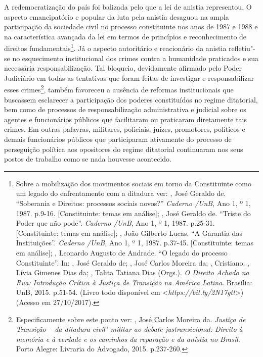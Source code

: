 A redemocratização do país foi balizada pelo que a lei de anistia
representou. O aspecto emancipatório e popular da luta pela anistia
desaguou na ampla participação da sociedade civil no processo
constituinte nos anos de 1987 e 1988 e na característica avançada da lei
em termos de princípios e reconhecimento de direitos
fundamentais\footnote{Sobre a mobilização dos movimentos sociais em
  torno da Constituinte como um legado do enfrentamento com a ditadura
  ver:  , José Geraldo de. ``Soberania e Direitos: processos
  sociais novos?'' \emph{Caderno /UnB}, Ano 1, º 1, 1987. p.9-16.
  {[}Constituinte: temas em análise{]};  , José Geraldo de.
  ``Triste do Poder que não pode''. \emph{Caderno /UnB}, Ano 1, º 1,
  1987. p.25-31. {[}Constituinte: temas em análise{]}; , João
  Gilberto Lucas. ``A Garantia das Instituições''. \emph{Caderno
  /UnB}, Ano 1, º 1, 1987. p.37-45. {[}Constituinte: temas em
  análise{]}; , Leonardo Augusto de Andrade. ``O legado do processo
  Constituinte''. In:  ,
  José Geraldo de;  , José
  Carlos Moreira da; , Cristiano; , Lívia Gimenes Dias da;
  , Talita Tatiana Dias (Orgs.). \emph{O Direito Achado na Rua:
  Introdução Crítica à Justiça de Transição na América Latina}. Brasília:
  UnB, 2015. p.51-54. (Livro todo disponível em
  \textless{}\emph{https://bit.ly/2N17gtt}\textgreater{})
  (Acesso em 27/10/2017).}. Já o aspecto autoritário e reacionário
da anistia refletiu"-se no esquecimento institucional dos crimes contra a
humanidade praticados e sua necessária responsabilização. Tal bloqueio,
devidamente afirmado pelo Poder Judiciário em todas as tentativas que
foram feitas de investigar e responsabilizar esses crimes\footnote{Especificamente
  sobre este ponto ver:  , José Carlos Moreira da.
  \emph{Justiça de Transição -- da ditadura civil"-militar ao debate
  justransicional: Direito à memória e à verdade e os caminhos da
  reparação e da anistia no Brasil}. Porto Alegre: Livraria do Advogado,
  2015. p.237-260.}, também favoreceu a ausência de reformas
institucionais que buscassem esclarecer a participação dos poderes
constituídos no regime ditatorial, bem como de processos de
responsabilização administrativa e judicial sobre os agentes e
funcionários públicos que facilitaram ou praticaram diretamente tais
crimes. Em outras palavras, militares, policiais, juízes, promotores,
políticos e demais funcionários públicos que participaram ativamente do
processo de perseguição política aos opositores do regime ditatorial
continuaram nos seus postos de trabalho como se nada houvesse
acontecido.

